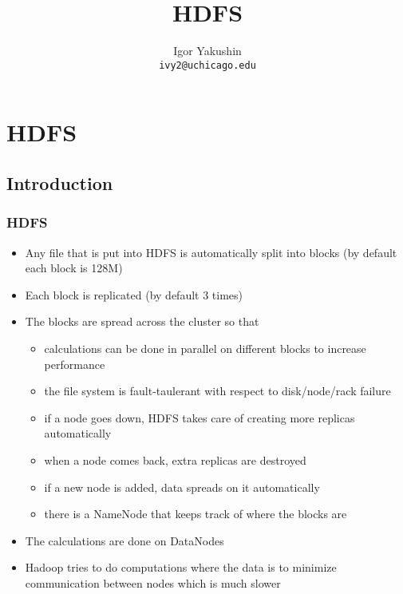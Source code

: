 \documentclass{beamer}
\title{\huge{HDFS}}
\author{Igor Yakushin \\ \texttt{ivy2@uchicago.edu}}
\date{}
\begin{document}



\begin{frame}
\titlepage
\end{frame}




\section{HDFS}
\subsection{Introduction}
\begin{frame}
 \frametitle{HDFS}
    \begin{itemize}
     \item Any file that is put into HDFS is automatically split into blocks (by default each block is 128M)
     \item Each block is replicated (by default 3 times)
     \item The blocks are spread across the cluster so that
      \begin{itemize}
	\item calculations can be done in parallel on different blocks to increase performance
	\item the file system is fault-taulerant with respect to disk/node/rack failure
	\item if a node goes down, HDFS takes care of creating more replicas automatically
	\item when a node comes back, extra replicas are destroyed
	\item if a new node is added, data spreads on it automatically
	\item there is a {\color{mycolordef}NameNode} that keeps track of where the blocks are
      \end{itemize}
	\item The calculations are done on {\color{mycolordef}DataNodes}
        \item Hadoop tries to do computations where the data is to minimize communication between nodes which is much slower
    \end{itemize} 
\end{frame}
\end{document}
